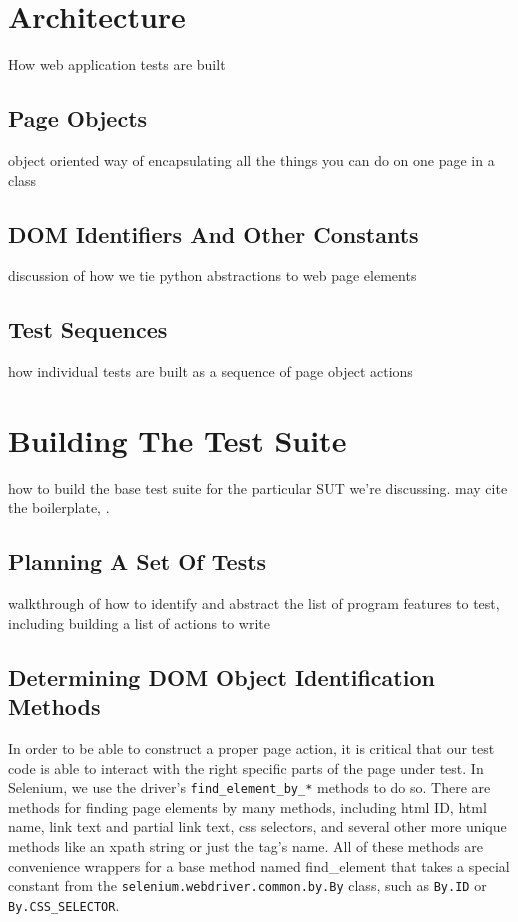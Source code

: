 \section{Architecture}
How web application tests are built

\subsection{Page Objects}
object oriented way of encapsulating all the things you can do on one page in a class \citep{liu2000object, kung2000object, leotta2013improving, marchetto2008state}

\subsection{DOM Identifiers And Other Constants}
discussion of how we tie python abstractions to web page elements \citep{gupta2003dom,DOMStand78, nicholus2016understanding}

\subsection{Test Sequences}
how individual tests are built as a sequence of page object actions \citep{leotta2013capture}

\section{Building The Test Suite}
how to build the base test suite for the particular SUT we're discussing. may cite the boilerplate, \citep{GitHubma29}.

\subsection{Planning A Set Of Tests}
walkthrough of how to identify and abstract the list of program features to test, including building a list of actions to write \citep{nguyen2001testing}

\subsection{Determining DOM Object Identification Methods}
In order to be able to construct a proper page action, it is critical that our test code is able to interact with the right specific parts of the page under test. In Selenium, we use the driver's \texttt{find\_element\_by\_*} methods to do so. There are methods for finding page elements by many methods, including html ID, html name, link text and partial link text, css selectors, and several other more unique methods like an xpath string or just the tag's name. All of these methods are convenience wrappers for a base method named find\_element that takes a special constant from the \texttt{selenium.webdriver.common.by.By} class, such as \texttt{By.ID} or \texttt{By.CSS\_SELECTOR}.

